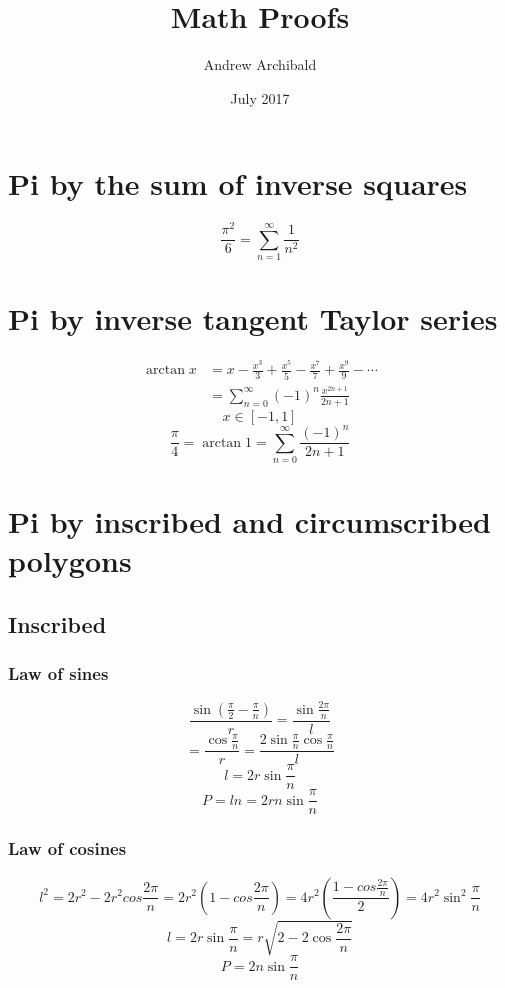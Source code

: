 \documentclass{article}
\title{Math Proofs}
\author{Andrew Archibald}
\date{July 2017}
\begin{document}
\begin{titlepage}
\maketitle
\end{titlepage}

\section{Pi by the sum of inverse squares}

$$\frac{\pi^2}{6} = \sum_{n=1}^{\infty}\frac{1}{n^2}$$

\section{Pi by inverse tangent Taylor series}

\begin{align*}
\arctan x &= x - \frac{x^3}{3} + \frac{x^5}{5} - \frac{x^7}{7} + \frac{x^9}{9} - \cdots \\
          &= \sum_{n=0}^{\infty} (-1)^n \frac{x^{2n + 1}}{2n + 1}
\end{align*}
$$x \in [-1, 1]$$
$$\frac{\pi}{4} = \arctan 1
= \sum_{n=0}^{\infty} \frac{(-1)^n}{2n + 1}$$

\section{Pi by inscribed and circumscribed polygons}

\subsection{Inscribed}

\subsubsection{Law of sines}

$$\frac{\sin(\frac{\pi}{2}-\frac{\pi}{n})}{r} = \frac{\sin\frac{2\pi}{n}}{l}$$
$$= \frac{\cos\frac{\pi}{n}}{r} = \frac{2\sin\frac{\pi}{n}\cos\frac{\pi}{n}}{l}$$
$$l = 2r\sin\frac{\pi}{n}$$
$$P = ln
= 2rn\sin\frac{\pi}{n}$$

\subsubsection{Law of cosines}

$$l^2 = 2r^2 - 2r^2cos\frac{2\pi}{n}
= 2r^2\left(1 - cos\frac{2\pi}{n}\right)
= 4r^2\left(\frac{1 - cos\frac{2\pi}{n}}{2}\right)
= 4r^2\sin^2{\frac{\pi}{n}}$$
$$l = 2r\sin\frac{\pi}{n} = r\sqrt{2 - 2\cos\frac{2\pi}{n}}$$
$$P = 2n\sin\frac{\pi}{n}$$
\end{document}
